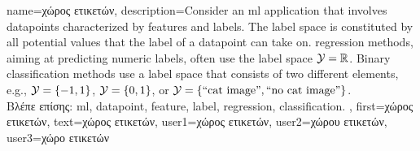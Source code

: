 {name={\foreignlanguage{greek}{χώρος ετικετών}},
	description={Consider an \gls{ml} application that involves \gls{datapoint}s characterized by \gls{feature}s 
		and \gls{label}s. The \gls{label} space is constituted by all potential values that the \gls{label} 
		of a \gls{datapoint} can take on. \Gls{regression} methods, aiming at predicting numeric \gls{label}s, often
		 use the \gls{label} space $\mathcal{Y} = \mathbb{R}$. Binary \gls{classification} methods use a \gls{label} space 
 		that consists of two different elements, e.g., $\mathcal{Y} =\{-1,1\}$, $\mathcal{Y}=\{0,1\}$, 
		or $\mathcal{Y} = \{ \mbox{``cat image''}, \mbox{``no cat image''} \}$.\\
		\foreignlanguage{greek}{Βλέπε επίσης:} \gls{ml}, \gls{datapoint}, \gls{feature}, \gls{label}, \gls{regression}, \gls{classification}.
		}, first={\foreignlanguage{greek}{χώρος ετικετών}},
		text={\foreignlanguage{greek}{χώρος ετικετών}},
		user1={\foreignlanguage{greek}{χώρος ετικετών}}, %
  		user2={\foreignlanguage{greek}{χώρου ετικετών}}, %
		user3={\foreignlanguage{greek}{χώρο ετικετών}} %
}


